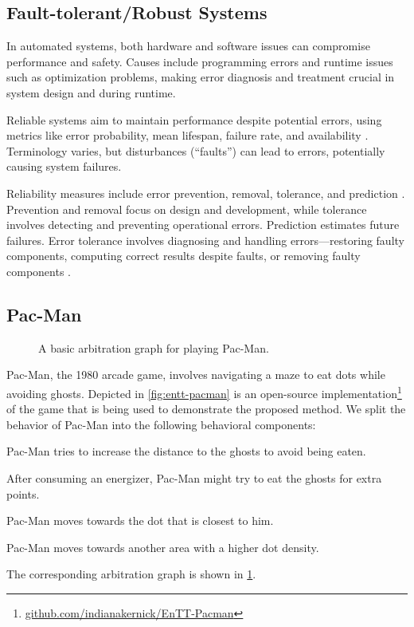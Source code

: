 

\subsection{Fault-tolerant/Robust Systems}

In automated systems, both hardware and software issues can compromise performance and safety.
Causes include programming errors and runtime issues such as optimization problems, making error diagnosis and treatment crucial in system design and during runtime.

Reliable systems aim to maintain performance
despite potential errors, using metrics like error probability, mean lifespan, failure rate, and availability \cite{echtleFehlertoleranzverfahren1990}.
Terminology varies, but disturbances (\enquote{faults}) can lead to errors, potentially causing system failures.

Reliability measures include error prevention, removal, tolerance, and prediction \cite{dubrovaFaultTolerantDesign2013}.
Prevention and removal focus on design and development, while tolerance involves detecting and preventing operational errors.
Prediction estimates future failures.
Error tolerance involves diagnosing and handling errors—restoring faulty components,
computing correct results despite faults, or removing faulty components \cite{echtleFehlertoleranzverfahren1990}.

\subsection{Pac-Man}

\begin{figure}
    \centering
    
    \caption{A basic arbitration graph for playing Pac-Man.}
    \label{fig:pacman-arbitrator-base}
\end{figure}

Pac-Man, the 1980 arcade game, involves navigating a maze to eat dots while avoiding ghosts.
Depicted in \cref{fig:entt-pacman} is an open-source implementation\footnote{\url{github.com/indianakernick/EnTT-Pacman}}
of the game that is being used to demonstrate the proposed method.
We split the behavior of Pac-Man into the following behavioral components:
\begin{description}[align=left]
    \item[Avoid Ghosts] Pac-Man tries to increase the distance to the ghosts to avoid being eaten.
    \item[Chase Ghosts] After consuming an energizer, Pac-Man might try to eat the ghosts for extra points.
    \item[Eat Closest Dot] Pac-Man moves towards the dot that is closest to him.
    \item[Change Dot Cluster] Pac-Man moves towards another area with a higher dot density.
\end{description}

The corresponding arbitration graph is shown in \cref{fig:pacman-arbitrator-base}.

